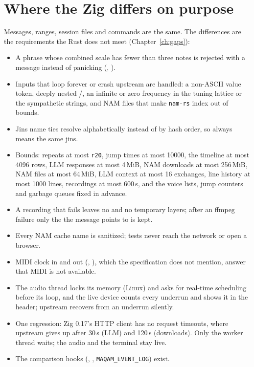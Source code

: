\section{Where the Zig differs on purpose}
Messages, ranges, session files and commands are the same. The differences are
the requirements the Rust does not meet (Chapter~\ref{ch:gaps}):

\begin{itemize}
  \item A phrase whose combined scale has fewer than three notes is rejected
  with a message instead of panicking (, ).
  \item Inputs that loop forever or crash upstream are handled: a non-ASCII
  value token, deeply nested /, an infinite or zero
  frequency in the tuning lattice or the sympathetic strings, and NAM files
  that make \texttt{nam-rs} index out of bounds.
  \item Jins name ties resolve alphabetically instead of by hash order, so
   always means the same jins.
  \item Bounds: repeats at most \texttt{r20}, jump times at most 10000, the
  timeline at most 4096 rows, LLM responses at most 4\,MiB, NAM downloads at
  most 256\,MiB, NAM files at most 64\,MiB, LLM context at most 16
  exchanges, line history at most 1000 lines, recordings at most 600\,s, and
  the voice lists, jump counters and garbage queues fixed in advance.
  \item A recording that fails leaves no  and no temporary
  layers; after an ffmpeg failure only the  the message
  points to is kept.
  \item Every NAM cache name is sanitized; tests never reach the network or
  open a browser.
  \item MIDI clock in and out (, ), which the
  specification does not mention, answer that MIDI is not available.
  \item The audio thread locks its memory (Linux) and asks for real-time
  scheduling before its loop, and the live device counts every underrun and shows it in
  the header; upstream recovers from an underrun silently.
  \item One regression: Zig 0.17's HTTP client has no request timeouts, where
  upstream gives up after 30\,s (LLM) and 120\,s (downloads). Only the worker
  thread waits; the audio and the terminal stay live.
  \item The comparison hooks (, ,
  \texttt{MAQAM\_EVENT\_LOG}) exist.
\end{itemize}

